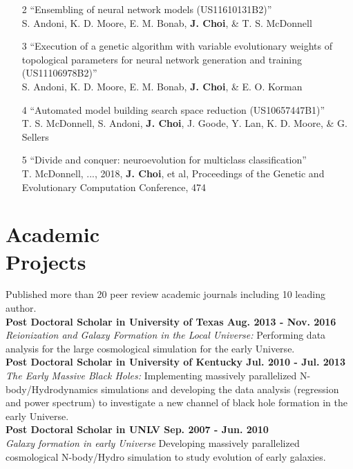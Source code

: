 \documentclass[margin,centered]{res}
\begin{document}
\begin{resume}
\begin{enumerate}

\item[2] ``Ensembling of neural network models (US11610131B2)'' \\ S. Andoni, K. D. Moore, E. M. Bonab, \textbf{J. Choi}, \& T. S. McDonnell 

\item[3] ``Execution of a genetic algorithm with variable evolutionary weights of topological parameters for neural network generation and training (US11106978B2)'' \\ S. Andoni, K. D. Moore, E. M. Bonab, \textbf{J. Choi}, \& E. O. Korman

\item[4] ``Automated model building search space reduction (US10657447B1)'' \\ T. S. McDonnell, S. Andoni, \textbf{J. Choi}, J. Goode, Y. Lan, K. D. Moore, \& G. Sellers

\item[5] ``Divide and conquer: neuroevolution for multiclass classification'' \\ T. McDonnell, ..., 2018, \textbf{J. Choi}, et al, Proceedings of the Genetic and Evolutionary Computation Conference, 474

\end{enumerate} 

\section{Academic \\ Projects} Published more than 20 peer review academic journals including 10 leading author.\\
{\bf Post Doctoral Scholar in University of Texas Aug. 2013 - Nov. 2016} \\ 
{\it Reionization and Galaxy Formation in the Local Universe:} Performing data analysis for the large cosmological simulation for the early Universe.\\
{\bf Post Doctoral Scholar in University of Kentucky Jul. 2010 - Jul. 2013 } \\
{\it The Early Massive Black Holes:} Implementing massively parallelized N-body/Hydrodynamics simulations and developing the data analysis (regression and power spectrum) to investigate a new channel of black hole formation in the early Universe.\\
{\bf Post Doctoral Scholar in UNLV Sep. 2007 - Jun. 2010} \\
{\it Galaxy formation in early Universe}  Developing massively parallelized cosmological N-body/Hydro simulation to study evolution of early galaxies.


\end{resume}
\end{document}
